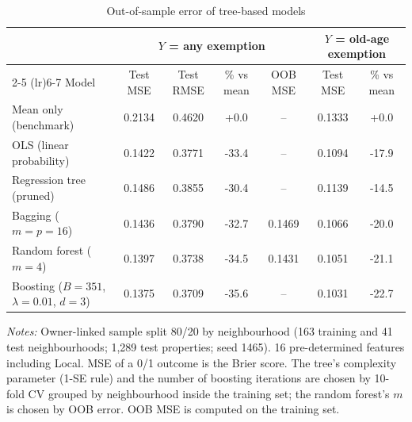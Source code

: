 \begin{table}[!htbp]\centering\footnotesize
\caption{Out-of-sample error of tree-based models}\label{tab:ml}
\begin{threeparttable}
\begin{tabular}{lcccccc}
\toprule
 & \multicolumn{4}{c}{$Y$ = any exemption} & \multicolumn{2}{c}{$Y$ = old-age exemption} \\
\cmidrule(lr){2-5} \cmidrule(lr){6-7}
Model & Test MSE & Test RMSE & \% vs mean & OOB MSE & Test MSE & \% vs mean \\
\midrule
Mean only (benchmark) & 0.2134 & 0.4620 & +0.0 & -- & 0.1333 & +0.0 \\
OLS (linear probability) & 0.1422 & 0.3771 & -33.4 & -- & 0.1094 & -17.9 \\
Regression tree (pruned) & 0.1486 & 0.3855 & -30.4 & -- & 0.1139 & -14.5 \\
Bagging ($m=p=16$) & 0.1436 & 0.3790 & -32.7 & 0.1469 & 0.1066 & -20.0 \\
Random forest ($m=4$) & 0.1397 & 0.3738 & -34.5 & 0.1431 & 0.1051 & -21.1 \\
Boosting ($B=351$, $\lambda=0.01$, $d=3$) & 0.1375 & 0.3709 & -35.6 & -- & 0.1031 & -22.7 \\
\bottomrule
\end{tabular}
\begin{tablenotes}[flushleft]\scriptsize
\item \textit{Notes:} Owner-linked sample split 80/20 by neighbourhood (163 training and 41 test neighbourhoods; 1,289 test properties; seed 1465). 16 pre-determined features including Local. MSE of a 0/1 outcome is the Brier score. The tree's complexity parameter (1-SE rule) and the number of boosting iterations are chosen by 10-fold CV grouped by neighbourhood inside the training set; the random forest's $m$ is chosen by OOB error. OOB MSE is computed on the training set.
\end{tablenotes}
\end{threeparttable}
\end{table}